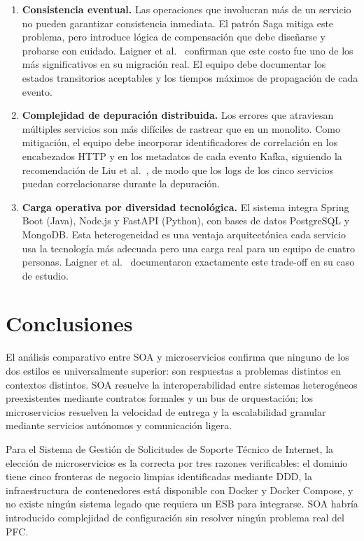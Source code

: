 \documentclass[12pt, a4paper]{article}
\begin{document}
\begin{enumerate}
  \item \textbf{Consistencia eventual.} Las operaciones que involucran más de un
        servicio no pueden garantizar consistencia inmediata. El patrón Saga mitiga
        este problema, pero introduce lógica de compensación que debe diseñarse y
        probarse con cuidado. Laigner et al.~\cite{laigner2020} confirman que este
        costo fue uno de los más significativos en su migración real. El equipo
        debe documentar los estados transitorios aceptables y los tiempos máximos
        de propagación de cada evento.
\newpage
  \item \textbf{Complejidad de depuración distribuida.} Los errores que atraviesan
        múltiples servicios son más difíciles de rastrear que en un monolito. Como
        mitigación, el equipo debe incorporar identificadores de correlación en los
        encabezados HTTP y en los metadatos de cada evento Kafka, siguiendo la
        recomendación de Liu et al.~\cite{liu2020}, de modo que los logs de los
        cinco servicios puedan correlacionarse durante la depuración.

  \item \textbf{Carga operativa por diversidad tecnológica.} El sistema integra
        Spring Boot (Java), Node.js y FastAPI (Python), con bases de datos
        PostgreSQL y MongoDB. Esta heterogeneidad es una ventaja arquitectónica
        cada servicio usa la tecnología más adecuada pero una carga real
        para un equipo de cuatro personas. Laigner et al.~\cite{laigner2020}
        documentaron exactamente este trade-off en su caso de estudio.
\end{enumerate}

\section{Conclusiones}
\label{sec:conclusiones}

El análisis comparativo entre SOA y microservicios confirma que ninguno de los
dos estilos es universalmente superior: son respuestas a problemas distintos en
contextos distintos. SOA resuelve la interoperabilidad entre sistemas heterogéneos
preexistentes mediante contratos formales y un bus de orquestación; los
microservicios resuelven la velocidad de entrega y la escalabilidad granular
mediante servicios autónomos y comunicación ligera.

Para el Sistema de Gestión de Solicitudes de Soporte Técnico de Internet, la
elección de microservicios es la correcta por tres razones verificables: el
dominio tiene cinco fronteras de negocio limpias identificadas mediante DDD, la
infraestructura de contenedores está disponible con Docker y Docker Compose, y no
existe ningún sistema legado que requiera un ESB para integrarse. SOA habría
introducido complejidad de configuración sin resolver ningún problema real del PFC.
\end{document}

